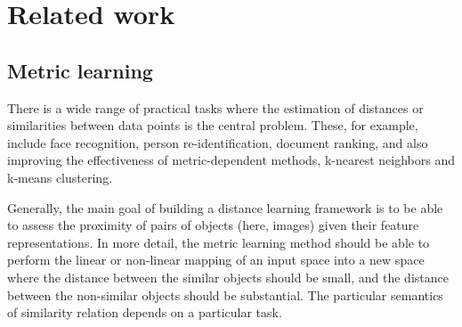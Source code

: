 \chapter{Related work}
\section{Metric learning}
\label{sec:metric_learning}
There is a wide range of practical tasks where the estimation of distances or similarities between data points is the central problem. These, for example, include face recognition, person re-identification, document ranking, and also improving the effectiveness of metric-dependent methods, \eg{} k-nearest neighbors and k-means clustering.

Generally, the main goal of building a distance learning framework is to be able to assess the proximity of pairs of objects (here, images) given their feature representations. In more detail, the metric learning method should be able to perform the linear or non-linear mapping of an input space into a new space where the distance between the similar objects should be small, and the distance between the non-similar objects should be substantial. The particular semantics of similarity relation depends on a particular task. 

